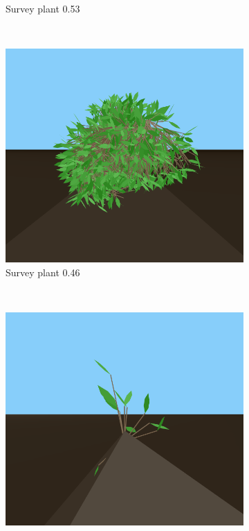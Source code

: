 \begin{figure}
\begin{subfigure}{0.48\textwidth}
        \caption{Survey plant 0.53}
    \end{subfigure}
    \\
    \begin{subfigure}{0.48\textwidth}
        \includegraphics[width=\textwidth]{figures/plant-46}
        \caption{Survey plant 0.46}
    \end{subfigure}
    ~
    \begin{subfigure}{0.48\textwidth}
        \includegraphics[width=\textwidth]{figures/plant-40}

\end{subfigure}
\end{figure}
